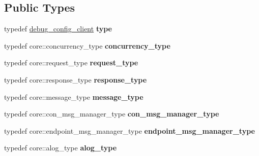 \subsection*{Public Types}
\begin{DoxyCompactItemize}
\item 
typedef \hyperlink{structdebug__config__client}{debug\+\_\+config\+\_\+client} {\bfseries type}\hypertarget{structdebug__config__client_a3f806aca7fcd1a2edfcef415cd20e560}{}\label{structdebug__config__client_a3f806aca7fcd1a2edfcef415cd20e560}

\item 
typedef core\+::concurrency\+\_\+type {\bfseries concurrency\+\_\+type}\hypertarget{structdebug__config__client_a55d8424f18283484cf48f89bdc39aad6}{}\label{structdebug__config__client_a55d8424f18283484cf48f89bdc39aad6}

\item 
typedef core\+::request\+\_\+type {\bfseries request\+\_\+type}\hypertarget{structdebug__config__client_a9faaed2dfa03aca1c5b4e2f1666d95f7}{}\label{structdebug__config__client_a9faaed2dfa03aca1c5b4e2f1666d95f7}

\item 
typedef core\+::response\+\_\+type {\bfseries response\+\_\+type}\hypertarget{structdebug__config__client_a587ddfa30d37e0380a4743490b64ac42}{}\label{structdebug__config__client_a587ddfa30d37e0380a4743490b64ac42}

\item 
typedef core\+::message\+\_\+type {\bfseries message\+\_\+type}\hypertarget{structdebug__config__client_a4f68549a7c38f9cddb47866c5d1403ac}{}\label{structdebug__config__client_a4f68549a7c38f9cddb47866c5d1403ac}

\item 
typedef core\+::con\+\_\+msg\+\_\+manager\+\_\+type {\bfseries con\+\_\+msg\+\_\+manager\+\_\+type}\hypertarget{structdebug__config__client_af6d340b99f64df85383c61097f983ef1}{}\label{structdebug__config__client_af6d340b99f64df85383c61097f983ef1}

\item 
typedef core\+::endpoint\+\_\+msg\+\_\+manager\+\_\+type {\bfseries endpoint\+\_\+msg\+\_\+manager\+\_\+type}\hypertarget{structdebug__config__client_a51369e5f60139b0c3af368df1b832ca3}{}\label{structdebug__config__client_a51369e5f60139b0c3af368df1b832ca3}

\item 
typedef core\+::alog\+\_\+type {\bfseries alog\+\_\+type}\hypertarget{structdebug__config__client_a5dd3669351d46c84cff9bf989f8d2897}{}\label{structdebug__config__client_a5dd3669351d46c84cff9bf989f8d2897}


\end{DoxyCompactItemize}
